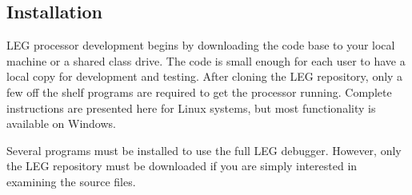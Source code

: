 \subsection{Installation} \label{sec:install}
LEG processor development begins by downloading the code base to your local machine or a shared class drive.
The code is small enough for each user to have a local copy for development and testing.
After cloning the LEG repository, only a few off the shelf programs are required to get the processor running.
Complete instructions are presented here for Linux systems, but most functionality is available on Windows.

Several programs must be installed to use the full LEG debugger. 
However, only the LEG repository must be downloaded if you are simply interested in examining the source files.

